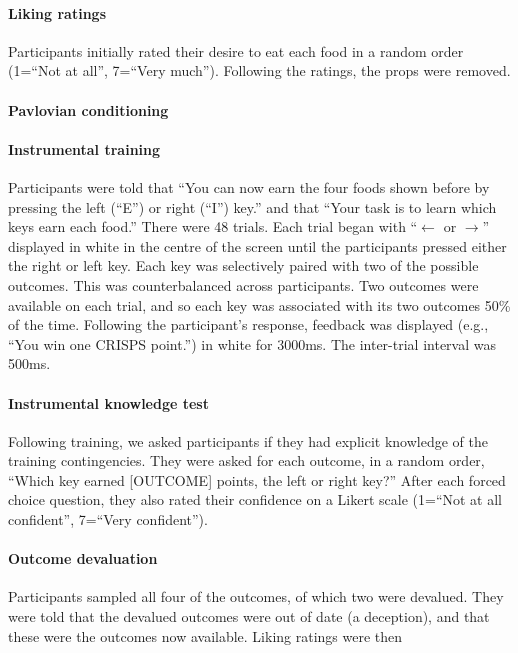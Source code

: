 \documentclass[12pt]{article}
\begin{document}
\paragraph{Liking ratings} Participants initially rated their desire to eat
each food in a random order (1=``Not at all'', 7=``Very much''). Following the
ratings, the props were removed. 

\paragraph{Pavlovian conditioning}

\paragraph{Instrumental training} Participants were told that ``You can now
earn the four foods shown before by pressing the left (``E'') or right (``I'')
key.'' and that ``Your task is to learn which keys earn each food.'' There were
48 trials. Each trial began with ``$\leftarrow$ or $\rightarrow$'' displayed in
white in the centre of the screen until the participants pressed either the
right or left key. Each key was selectively paired with two of the possible
outcomes. This was counterbalanced across participants. Two outcomes were
available on each trial, and so each key was associated with its two outcomes
50\% of the time. Following the participant's response, feedback was displayed 
(e.g., ``You win one CRISPS point.'') in white for 3000ms. The inter-trial
interval was 500ms.

\paragraph{Instrumental knowledge test}
Following training, we asked participants if they had explicit knowledge of the
training contingencies. They were asked for each outcome, in a random order,
``Which key earned [OUTCOME] points, the left or right key?'' After each forced
choice question, they also rated their confidence on a Likert scale (1=``Not at
all confident'', 7=``Very confident''). 

\paragraph{Outcome devaluation}
Participants sampled all four of the outcomes, of which two were devalued. They
were told that the devalued outcomes were out of date (a deception), and that
these were the outcomes now available. Liking ratings were then 
\end{document}

